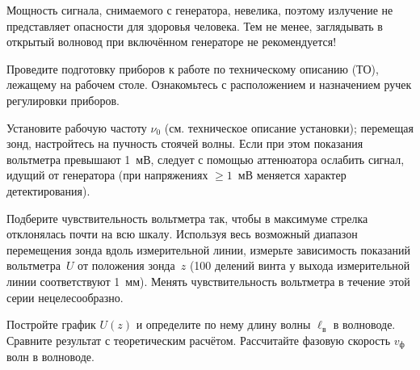 \begin{lab:task}
    
    
    
    \item Мощность сигнала, снимаемого с генератора, невелика, поэтому
    излучение не представляет опасности для здоровья человека. Тем не менее,
    заглядывать в открытый волновод при включённом генераторе не рекомендуется!
    
    
    \item Проведите подготовку приборов к работе по техническому описанию (ТО),
    лежащему на рабочем столе. Ознакомьтесь с расположением и назначением
    ручек регулировки приборов.
    
    \item Установите рабочую частоту $\nu_0$ (см. техническое описание установки); 
    перемещая зонд, настройтесь на пучность стоячей волны. 
    Если при этом показания вольтметра превышают 1~мВ, 
    следует с помощью аттенюатора ослабить сигнал, идущий от генератора  (при
    напряжениях $\ge1$~мВ меняется характер детектирования).
    
    \item Подберите чувствительность вольтметра так,
    чтобы в максимуме стрелка отклонялась почти на всю шкалу. Используя весь
    возможный диапазон перемещения зонда вдоль измерительной линии, измерьте
    зависимость показаний вольтметра~$U$ от положения зонда~$z$ (100 делений винта
    у выхода измерительной линии соответствуют 1~мм). Менять чувствительность
    вольтметра в течение этой серии нецелесообразно.
    
    \item Постройте график $U(z)$ и определите по нему длину волны
    $\ell_{\text{в}}$ в волноводе. Сравните результат с теоретическим расчётом.
    Рассчитайте фазовую скорость $v_{\text{ф}}$ волн в волноводе. 
    

\end{lab:task}
